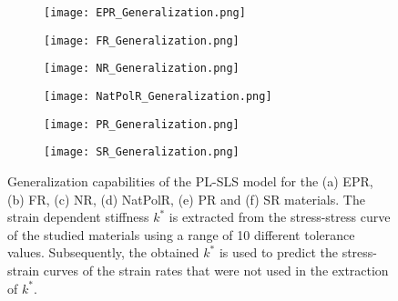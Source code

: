 \begin{figure}[htbp!]
	\centering
    \begin{subfigure}[b]{0.49\textwidth}
        \centering
        \texttt{[image: EPR\_Generalization.png]}
        \caption{}
        \label{fig:GenEPR}
    \end{subfigure}
    \begin{subfigure}[b]{0.49\textwidth}
        \centering
        \texttt{[image: FR\_Generalization.png]}
        \caption{}
        \label{fig:GenFR}
    \end{subfigure}
    \begin{subfigure}[b]{0.49\textwidth}
        \centering
        \texttt{[image: NR\_Generalization.png]}
        \caption{}
        \label{fig:GenNR}
    \end{subfigure}
    \begin{subfigure}[b]{0.49\textwidth}
        \centering
        \texttt{[image: NatPolR\_Generalization.png]}
        \caption{}
        \label{fig:GenNatPolR}
    \end{subfigure}  
    \begin{subfigure}[b]{0.49\textwidth}
        \centering
        \texttt{[image: PR\_Generalization.png]}
        \caption{}
        \label{fig:GenPR}
    \end{subfigure}  
    \begin{subfigure}[b]{0.49\textwidth}
        \centering
        \texttt{[image: SR\_Generalization.png]}
        \caption{}
        \label{fig:GenSR}
    \end{subfigure}  
    \caption{Generalization capabilities of the PL-SLS model for the (a) EPR, (b) FR, (c) NR, (d) NatPolR, (e) PR and (f) SR materials. The strain dependent stiffness $k^*$ is extracted from the stress-stress curve of the studied materials using a range of 10 different tolerance values. Subsequently, the obtained $k^*$ is used to predict the stress-strain curves of the strain rates that were not used in the extraction of $k^*$.}
    \label{fig:GenAlmostAll}
\end{figure}

